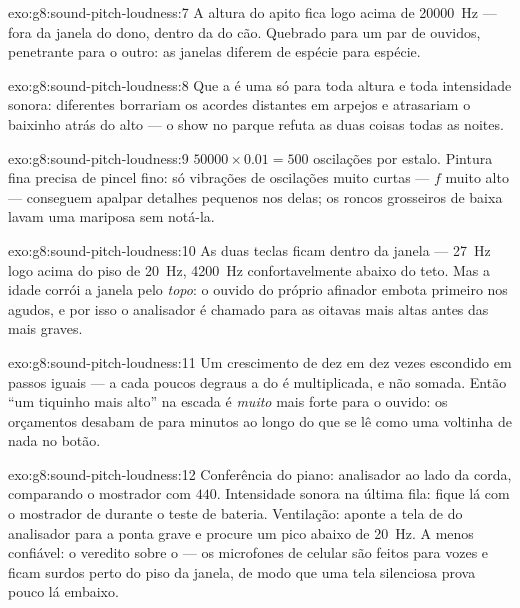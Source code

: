 \begin{solution}{exo:g8:sound-pitch-loudness:7}
A altura do apito fica logo acima de \qty{20000}{Hz} --- fora da
janela do dono, dentro da do cão. Quebrado para um par de ouvidos,
penetrante para o outro: as janelas diferem de espécie para espécie.
\end{solution}

\begin{solution}{exo:g8:sound-pitch-loudness:8}
Que a  é uma só para toda altura e toda intensidade
sonora:  diferentes borrariam os acordes distantes em
arpejos e atrasariam o baixinho atrás do alto --- o show no parque
refuta as duas coisas todas as noites.
\end{solution}

\begin{solution}{exo:g8:sound-pitch-loudness:9}
$50000 \times 0.01 = 500$ oscilações por estalo. Pintura fina precisa
de pincel fino: só vibrações de oscilações muito curtas --- $f$ muito
alto --- conseguem apalpar detalhes pequenos nos  delas; os
roncos grosseiros de  baixa lavam uma mariposa sem notá-la.
\end{solution}

\begin{solution}{exo:g8:sound-pitch-loudness:10}
As duas teclas ficam dentro da janela --- \qty{27}{Hz} logo acima do
piso de \qty{20}{Hz}, \qty{4200}{Hz} confortavelmente abaixo do teto.
Mas a idade corrói a janela pelo \emph{topo}: o ouvido do próprio
afinador embota primeiro nos agudos, e por isso o analisador é
chamado para as oitavas mais altas antes das mais graves.
\end{solution}

\begin{solution}{exo:g8:sound-pitch-loudness:11}
Um crescimento de dez em dez vezes escondido em passos iguais --- a
cada poucos degraus a  do  é multiplicada, e não somada.
Então ``um tiquinho mais alto'' na escada é \emph{muito} mais forte
para o ouvido: os orçamentos desabam de  para minutos ao longo
do que se lê como uma voltinha de nada no botão.
\end{solution}

\begin{solution}{exo:g8:sound-pitch-loudness:12}
Conferência do piano: analisador ao lado da corda, comparando o
mostrador com $440$. Intensidade sonora na última fila: fique lá com
o mostrador de  durante o teste de bateria. Ventilação:
aponte a tela de  do analisador para a ponta grave e procure
um pico abaixo de \qty{20}{Hz}. A menos confiável: o veredito sobre o
 --- os microfones de celular são feitos para vozes e ficam
surdos perto do piso da janela, de modo que uma tela silenciosa prova
pouco lá embaixo.
\end{solution}

